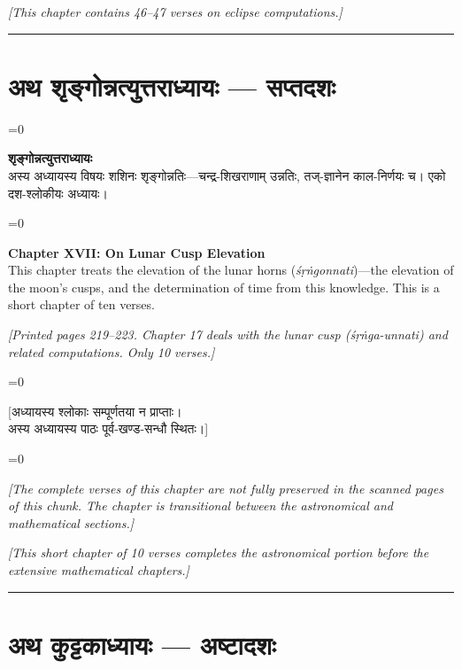 \documentclass[11pt,a4paper]{article}
\newcommand{\longline}{\noindent\rule{\textwidth}{0.4pt}}
\newcommand{\cnote}[1]{\textcolor{notecolor}{\textit{#1}}}
\newcommand{\dev}[1]{{\devanagarifont\color{sktcolor}#1}}
\newcommand{\dsec}[1]{\section*{\dev{#1}}}
\newcommand{\iast}[1]{\textit{#1}}
\newenvironment{paracol}[1]{\begingroup}{\endgroup}
\newcommand{\switchcolumn}[1][]{%
  \ifnum#1=0\relax\else\par\nobreak\vspace{0.5em}\par\nobreak\fi%
}
\begin{document}
\vspace{0.5cm}
\cnote{[This chapter contains 46–47 verses on eclipse computations.]}

\longline
\newpage

\dsec{अथ शृङ्गोन्नत्युत्तराध्यायः — सप्तदशः}

\begin{paracol}{2}
\switchcolumn[0]
\dev{%
\textbf{शृङ्गोन्नत्युत्तराध्यायः}\\[0.2cm]
अस्य अध्यायस्य विषयः शशिनः शृङ्गोन्नतिः—चन्द्र-शिखराणाम्
उन्नतिः, तज्-ज्ञानेन काल-निर्णयः च। एको दश-श्लोकीयः
अध्यायः।
}

\switchcolumn[1]
\textbf{Chapter XVII: On Lunar Cusp Elevation}\\[0.2cm]
This chapter treats the elevation of the lunar horns
(\iast{śṛṅgonnati})—the elevation of the moon's cusps, and the
determination of time from this knowledge. This is a short chapter
of ten verses.
\end{paracol}

\vspace{0.5cm}
\cnote{[Printed pages 219–223. Chapter 17 deals with the lunar cusp
(śṛṅga-unnati) and related computations. Only 10 verses.]}
\vspace{0.5cm}

\begin{paracol}{2}
\switchcolumn[0]
\dev{%
[अध्यायस्य श्लोकाः सम्पूर्णतया न प्राप्ताः।\\
अस्य अध्यायस्य पाठः पूर्व-खण्ड-सन्धौ स्थितः।]
}

\switchcolumn[1]
\textit{[The complete verses of this chapter are not fully preserved
in the scanned pages of this chunk. The chapter is transitional
between the astronomical and mathematical sections.]}
\end{paracol}

\vspace{0.5cm}
\cnote{[This short chapter of 10 verses completes the astronomical
portion before the extensive mathematical chapters.]}

\longline
\newpage

\dsec{अथ कुट्टकाध्यायः — अष्टादशः}
\end{document}
